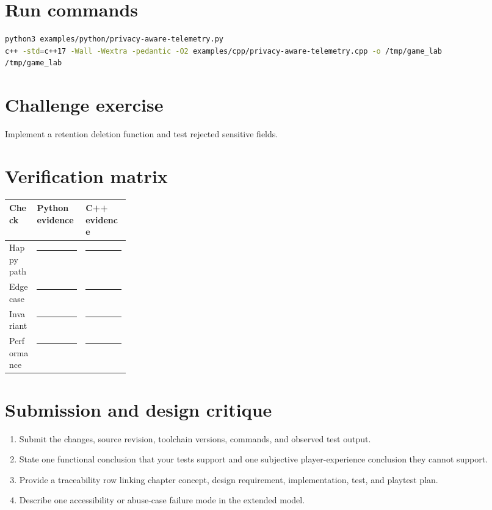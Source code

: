 \documentclass[11pt]{article}
\begin{document}
\section{Run commands}
\begin{lstlisting}[language=bash]
python3 examples/python/privacy-aware-telemetry.py
c++ -std=c++17 -Wall -Wextra -pedantic -O2 examples/cpp/privacy-aware-telemetry.cpp -o /tmp/game_lab
/tmp/game_lab
\end{lstlisting}

\section{Challenge exercise}
Implement a retention deletion function and test rejected sensitive fields.


\section{Verification matrix}
\begin{tabularx}{\linewidth}{@{}p{0.23\linewidth}X X@{}}\toprule Check & Python evidence & C++ evidence\\\midrule
Happy path & \rule{0.85\linewidth}{0.4pt} & \rule{0.85\linewidth}{0.4pt}\\[0.35cm]
Edge case & \rule{0.85\linewidth}{0.4pt} & \rule{0.85\linewidth}{0.4pt}\\[0.35cm]
Invariant & \rule{0.85\linewidth}{0.4pt} & \rule{0.85\linewidth}{0.4pt}\\[0.35cm]
Performance & \rule{0.85\linewidth}{0.4pt} & \rule{0.85\linewidth}{0.4pt}\\\bottomrule\end{tabularx}

\section{Submission and design critique}
\begin{enumerate}
\item Submit the changes, source revision, toolchain versions, commands, and observed test output.
\item State one functional conclusion that your tests support and one subjective player-experience conclusion they cannot support.
\item Provide a traceability row linking chapter concept, design requirement, implementation, test, and playtest plan.
\item Describe one accessibility or abuse-case failure mode in the extended model.
\end{enumerate}
\end{document}
